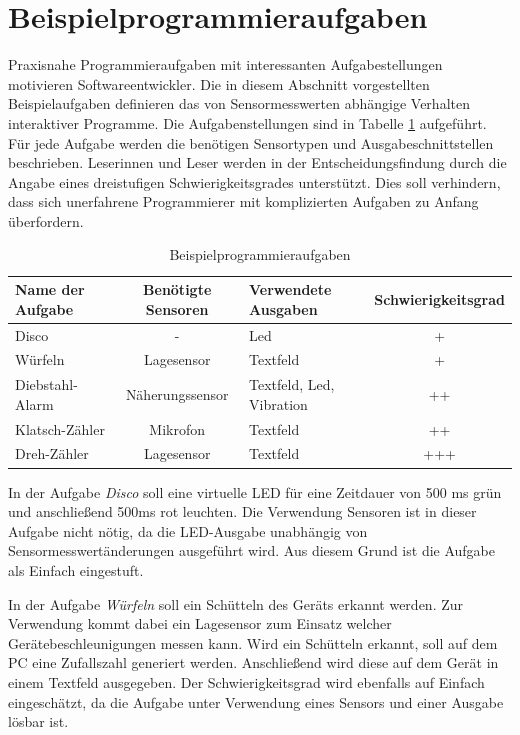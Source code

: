 \documentclass[11pt,a4paper]{report}
\begin{document}
\section{Beispielprogrammieraufgaben}\label{sec:activities}
Praxisnahe Programmieraufgaben mit interessanten Aufgabestellungen motivieren Softwareentwickler.
Die in diesem Abschnitt vorgestellten Beispielaufgaben definieren das von Sensormesswerten abhängige Verhalten interaktiver Programme.
Die Aufgabenstellungen sind in Tabelle \ref{tab:excercises} aufgeführt.
Für jede Aufgabe werden die benötigen Sensortypen und Ausgabeschnittstellen beschrieben.
Leserinnen und Leser werden in der Entscheidungsfindung durch die Angabe eines dreistufigen Schwierigkeitsgrades unterstützt.
Dies soll verhindern, dass sich unerfahrene Programmierer mit komplizierten Aufgaben zu Anfang überfordern.
\begin{table}[htbp]
  \centering
  \begin{tabular}{|l|c|p{2cm}|c|}
      \hline
      \textbf{Name der Aufgabe} & \textbf{Benötigte Sensoren} & \textbf{Verwendete Ausgaben} & \textbf{Schwierigkeitsgrad} \\
      \hline
      Disco & - & Led & + \\
      \hline
      Würfeln & Lagesensor & Textfeld &+ \\
      \hline
      Diebstahl-Alarm & Näherungssensor & Textfeld, Led, Vibration & ++ \\
      \hline
      Klatsch-Zähler & Mikrofon & Textfeld & ++ \\
      \hline
      Dreh-Zähler & Lagesensor & Textfeld & +++ \\
      \hline
  \end{tabular}
  \caption{Beispielprogrammieraufgaben}
  \label{tab:excercises}
\end{table}

In der Aufgabe \textit{Disco} soll eine virtuelle LED für eine Zeitdauer von 500 ms grün und anschließend 500ms rot leuchten.
Die Verwendung Sensoren ist in dieser Aufgabe nicht nötig, da die LED-Ausgabe unabhängig von Sensormesswertänderungen ausgeführt wird.
Aus diesem Grund ist die Aufgabe als Einfach eingestuft.

In der Aufgabe \textit{Würfeln} soll ein Schütteln des Geräts erkannt werden.
Zur Verwendung kommt dabei ein Lagesensor zum Einsatz welcher Gerätebeschleunigungen messen kann.
Wird ein Schütteln erkannt, soll auf dem PC eine Zufallszahl generiert werden.
Anschließend wird diese auf dem Gerät in einem Textfeld ausgegeben.
Der Schwierigkeitsgrad wird ebenfalls auf Einfach eingeschätzt, da die Aufgabe unter Verwendung eines Sensors und einer Ausgabe lösbar ist.
\end{document}
